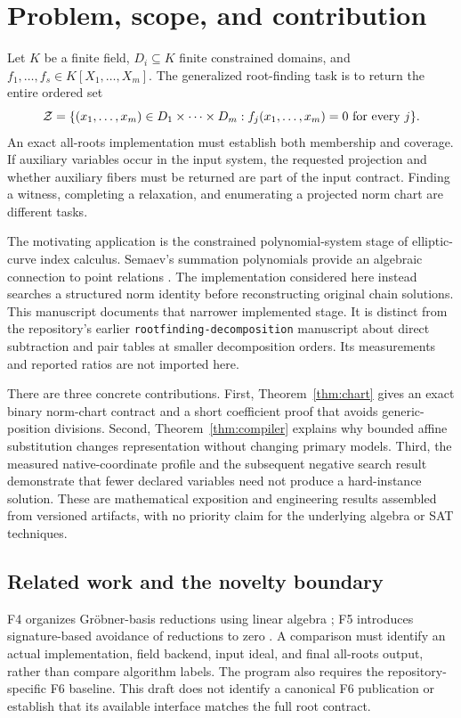 \section{Problem, scope, and contribution}
Let $K$ be a finite field, $D_i\subseteq K$ finite constrained domains, and
$f_1,\ldots,f_s\in K[X_1,\ldots,X_m]$. The generalized root-finding task is to
return the entire ordered set
\[
 {\cal Z}=\{(x_1,\ldots,x_m)\in D_1\times\cdots\times D_m:
                    f_j(x_1,\ldots,x_m)=0\text{ for every }j\}.
\]
An exact all-roots implementation must establish both membership and coverage.
If auxiliary variables occur in the input system, the requested projection and
whether auxiliary fibers must be returned are part of the input contract.
Finding a witness, completing a relaxation, and enumerating a projected norm
chart are different tasks.

The motivating application is the constrained polynomial-system stage of
elliptic-curve index calculus. Semaev's summation polynomials provide an algebraic
connection to point relations \cite{semaev}. The implementation considered here
instead searches a structured norm identity before reconstructing original
chain solutions. This manuscript documents that narrower implemented stage.
It is distinct from the repository's earlier \texttt{rootfinding-decomposition}
manuscript about direct subtraction and pair tables at smaller decomposition
orders. Its measurements and reported ratios are not imported here.

There are three concrete contributions. First, Theorem~\ref{thm:chart} gives
an exact binary norm-chart contract and a short coefficient proof that avoids
generic-position divisions. Second, Theorem~\ref{thm:compiler} explains why
bounded affine substitution changes representation without changing primary
models. Third, the measured native-coordinate profile and the subsequent
negative search result demonstrate that fewer declared variables need not
produce a hard-instance solution. These are mathematical exposition and
engineering results assembled from versioned artifacts, with no priority claim
for the underlying algebra or SAT techniques.

\subsection{Related work and the novelty boundary}
F4 organizes Gr\"obner-basis reductions using linear algebra
\cite{f4}; F5 introduces signature-based avoidance of reductions to zero
\cite{f5}. A comparison must identify an actual implementation, field backend,
input ideal, and final all-roots output, rather than compare algorithm labels.
The program also requires the repository-specific F6 baseline. This draft
does not identify a canonical F6 publication or establish that its available
interface matches the full root contract.

